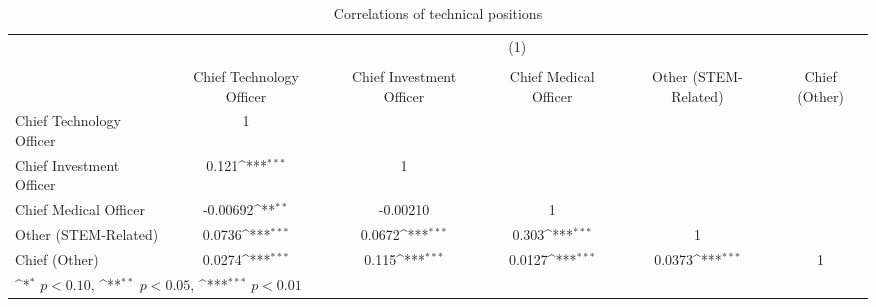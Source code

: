 \begin{table}[htbp]\centering
\def\sym#1{\ifmmode^{#1}\else\(^{#1}\)\fi}
\caption{Correlations of technical positions}
\begin{tabular}{l*{5}{c}}
\toprule
                &\multicolumn{5}{c}{(1)}                                                                       \\
                &\multicolumn{5}{c}{}                                                                          \\
                &Chief Technology Officer         &Chief Investment Officer         &Chief Medical Officer         &Other (STEM-Related)         &Chief (Other)         \\
\midrule
Chief Technology Officer&        1         &                  &                  &                  &                  \\
Chief Investment Officer&    0.121\sym{***}&        1         &                  &                  &                  \\
Chief Medical Officer& -0.00692\sym{**} & -0.00210         &        1         &                  &                  \\
Other (STEM-Related)&   0.0736\sym{***}&   0.0672\sym{***}&    0.303\sym{***}&        1         &                  \\
Chief (Other)   &   0.0274\sym{***}&    0.115\sym{***}&   0.0127\sym{***}&   0.0373\sym{***}&        1         \\
\bottomrule
\multicolumn{6}{l}{\footnotesize \sym{*} \(p<0.10\), \sym{**} \(p<0.05\), \sym{***} \(p<0.01\)}\\
\end{tabular}
\end{table}
